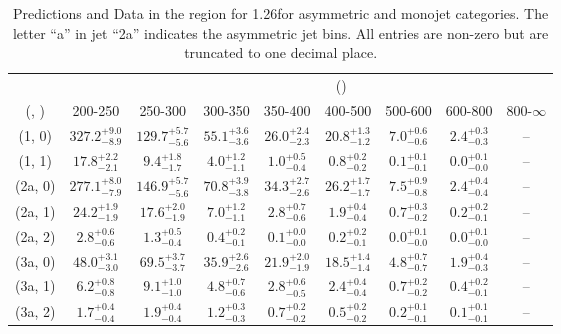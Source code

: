 \begin{table}[h!]
\tiny
\centering
\caption{Predictions and Data in the \mmj region for 1.26\ifb for asymmetric and monojet categories. The letter ``a'' in jet \eg ``2a''  indicates the asymmetric jet bins. All entries are non-zero but are truncated to one decimal place.\label{tab:prednodata_comb_mumu_asym}}
\begin{tabular}
{ccccccccc}
	\hline\hline
&	& \multicolumn{8}{c}{\scalht (\gev)} \\ 
	 (\njet,  \nb) & 200-250 & 250-300 & 300-350 & 350-400 & 400-500 & 500-600 & 600-800 & 800-$\infty$ \\ [0.8ex] 
\hline
	(1, 0) & $327.2^{+ 9.0 }_{- 8.9 }$ & $129.7^{+ 5.7 }_{- 5.6 }$ & $55.1^{+ 3.6 }_{- 3.6 }$ & $26.0^{+ 2.4 }_{- 2.3 }$ & $20.8^{+ 1.3 }_{- 1.2 }$ & $7.0^{+ 0.6 }_{- 0.6 }$ & $2.4^{+ 0.3 }_{- 0.3 }$ & -- \\[0.5ex] 
	(1, 1) & $17.8^{+ 2.2 }_{- 2.1 }$ & $9.4^{+ 1.8 }_{- 1.7 }$ & $4.0^{+ 1.2 }_{- 1.1 }$ & $1.0^{+ 0.5 }_{- 0.4 }$ & $0.8^{+ 0.2 }_{- 0.2 }$ & $0.1^{+ 0.1 }_{- 0.1 }$ & $0.0^{+ 0.1 }_{- 0.0 }$ & -- \\[0.5ex] 
	(2a, 0) & $277.1^{+ 8.0 }_{- 7.9 }$ & $146.9^{+ 5.7 }_{- 5.6 }$ & $70.8^{+ 3.9 }_{- 3.8 }$ & $34.3^{+ 2.7 }_{- 2.6 }$ & $26.2^{+ 1.7 }_{- 1.7 }$ & $7.5^{+ 0.9 }_{- 0.8 }$ & $2.4^{+ 0.4 }_{- 0.4 }$ & -- \\[0.5ex] 
	(2a, 1) & $24.2^{+ 1.9 }_{- 1.9 }$ & $17.6^{+ 2.0 }_{- 1.9 }$ & $7.0^{+ 1.2 }_{- 1.1 }$ & $2.8^{+ 0.7 }_{- 0.6 }$ & $1.9^{+ 0.4 }_{- 0.4 }$ & $0.7^{+ 0.3 }_{- 0.2 }$ & $0.2^{+ 0.2 }_{- 0.1 }$ & -- \\[0.5ex] 
	(2a, 2) & $2.8^{+ 0.6 }_{- 0.6 }$ & $1.3^{+ 0.5 }_{- 0.4 }$ & $0.4^{+ 0.2 }_{- 0.1 }$ & $0.1^{+ 0.0 }_{- 0.0 }$ & $0.2^{+ 0.2 }_{- 0.1 }$ & $0.0^{+ 0.1 }_{- 0.0 }$ & $0.0^{+ 0.1 }_{- 0.0 }$ & -- \\[0.5ex] 
	(3a, 0) & $48.0^{+ 3.1 }_{- 3.0 }$ & $69.5^{+ 3.7 }_{- 3.7 }$ & $35.9^{+ 2.6 }_{- 2.6 }$ & $21.9^{+ 2.0 }_{- 1.9 }$ & $18.5^{+ 1.4 }_{- 1.4 }$ & $4.8^{+ 0.7 }_{- 0.7 }$ & $1.9^{+ 0.4 }_{- 0.3 }$ & -- \\[0.5ex] 
	(3a, 1) & $6.2^{+ 0.8 }_{- 0.8 }$ & $9.1^{+ 1.0 }_{- 1.0 }$ & $4.8^{+ 0.7 }_{- 0.6 }$ & $2.8^{+ 0.6 }_{- 0.5 }$ & $2.4^{+ 0.4 }_{- 0.4 }$ & $0.7^{+ 0.2 }_{- 0.2 }$ & $0.4^{+ 0.2 }_{- 0.1 }$ & -- \\[0.5ex] 
	(3a, 2) & $1.7^{+ 0.4 }_{- 0.4 }$ & $1.9^{+ 0.4 }_{- 0.4 }$ & $1.2^{+ 0.3 }_{- 0.3 }$ & $0.7^{+ 0.2 }_{- 0.2 }$ & $0.5^{+ 0.2 }_{- 0.2 }$ & $0.2^{+ 0.1 }_{- 0.1 }$ & $0.1^{+ 0.1 }_{- 0.1 }$ & -- \\[0.5ex] 

\end{tabular}
\end{table}
